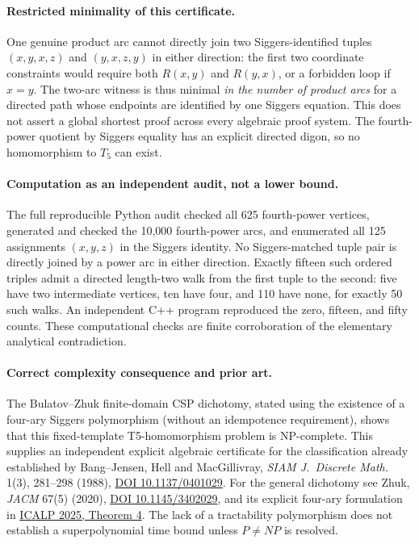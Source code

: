 \documentclass[11pt]{article}
\begin{document}
\paragraph{Restricted minimality of this certificate.}
One genuine product arc cannot directly join two
Siggers-identified tuples
$(x,y,x,z)$ and $(y,x,z,y)$ in either direction:
the first two coordinate constraints would require both
$R(x,y)$ and $R(y,x)$, or a forbidden loop if $x=y$.
The two-arc witness is thus minimal \emph{in the number
of product arcs} for a directed path whose endpoints are
identified by one Siggers equation. This does not assert a
global shortest proof across every algebraic proof system.
The fourth-power quotient by Siggers equality has an explicit
directed digon, so no homomorphism to $T_5$ can exist.

\paragraph{Computation as an independent audit, not a lower bound.}
The full reproducible Python audit checked all 625 fourth-power
vertices, generated and checked the 10,000 fourth-power arcs,
and enumerated all 125 assignments $(x,y,z)$ in the Siggers
identity. No Siggers-matched tuple pair is directly joined by
a power arc in either direction. Exactly fifteen such ordered
triples admit a directed length-two walk from the first tuple
to the second: five have two intermediate vertices, ten have
four, and 110 have none, for exactly 50 such walks.
An independent C++ program reproduced the zero, fifteen,
and fifty counts. These computational checks are finite
corroboration of the elementary analytical contradiction.

\paragraph{Correct complexity consequence and prior art.}
The Bulatov--Zhuk finite-domain CSP dichotomy, stated using
the existence of a four-ary Siggers polymorphism (without an
idempotence requirement), shows that this fixed-template
T5-homomorphism problem is NP-complete. This supplies an
independent explicit algebraic certificate for the
classification already established by Bang--Jensen,
Hell and MacGillivray, \emph{SIAM J.\ Discrete Math.} 1(3),
281--298 (1988),
\href{https://doi.org/10.1137/0401029}{DOI 10.1137/0401029}.
For the general dichotomy see Zhuk, \emph{JACM} 67(5) (2020),
\href{https://doi.org/10.1145/3402029}{DOI 10.1145/3402029},
and its explicit four-ary formulation in
\href{https://drops.dagstuhl.de/storage/00lipics/lipics-vol334-icalp2025/html/LIPIcs.ICALP.2025.158/LIPIcs.ICALP.2025.158.html}
{ICALP 2025, Theorem 4}.
The lack of a tractability polymorphism does not establish
a superpolynomial time bound unless $P\ne NP$ is resolved.
\end{document}

